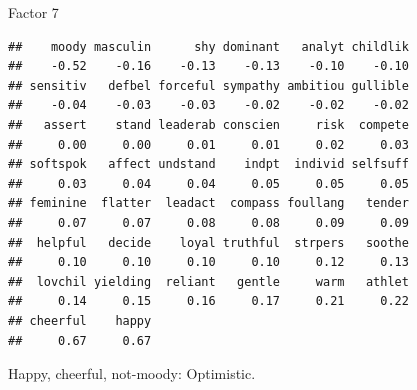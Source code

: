 \begin{frame}[fragile]{Factor 7}
  
  {\small
\begin{knitrout}
\color{fgcolor}\begin{kframe}
\begin{alltt}
\hlstd{mylist[[}\hlstd{]]}
\end{alltt}
\begin{verbatim}
##    moody masculin      shy dominant   analyt childlik 
##    -0.52    -0.16    -0.13    -0.13    -0.10    -0.10 
## sensitiv   defbel forceful sympathy ambitiou gullible 
##    -0.04    -0.03    -0.03    -0.02    -0.02    -0.02 
##   assert    stand leaderab conscien     risk  compete 
##     0.00     0.00     0.01     0.01     0.02     0.03 
## softspok   affect undstand    indpt  individ selfsuff 
##     0.03     0.04     0.04     0.05     0.05     0.05 
## feminine  flatter  leadact  compass foullang   tender 
##     0.07     0.07     0.08     0.08     0.09     0.09 
##  helpful   decide    loyal truthful  strpers   soothe 
##     0.10     0.10     0.10     0.10     0.12     0.13 
##  lovchil yielding  reliant   gentle     warm   athlet 
##     0.14     0.15     0.16     0.17     0.21     0.22 
## cheerful    happy 
##     0.67     0.67
\end{verbatim}
\end{kframe}
\end{knitrout}
}

Happy, cheerful, not-moody: Optimistic.

\end{frame}
